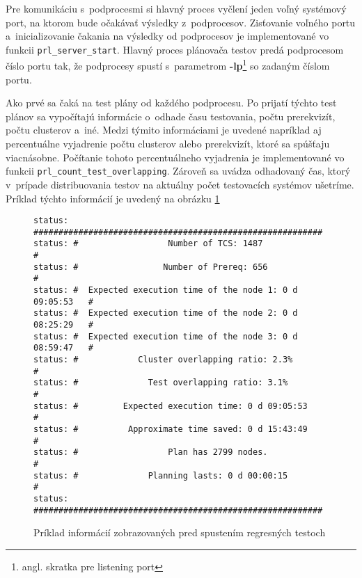 Pre komunikáciu s~podprocesmi si hlavný proces vyčlení jeden voľný systémový port,
na ktorom bude očakávať výsledky z~podprocesov. 
Zisťovanie voľného portu a~inicializovanie čakania na výsledky od podprocesov 
je implementované vo funkcii \texttt{prl\_server\_start}. 
Hlavný proces plánovača testov predá podprocesom číslo portu tak, že podprocesy
spustí s~parametrom \textbf{-lp}\footnote{angl. skratka pre listening port} so zadaným
číslom portu.

Ako prvé sa čaká na test plány od každého podprocesu. Po prijatí týchto test plánov sa vypočítajú informácie
o~odhade času testovania, počtu prerekvizít, počtu clusterov a~iné.
Medzi týmito informáciami je uvedené napríklad aj percentuálne vyjadrenie počtu clusterov alebo prerekvizít,
ktoré sa spúšťaju viacnásobne. Počítanie tohoto percentuálneho vyjadrenia 
je implementované vo funkcii \texttt{prl\_count\_test\_overlapping}.
Zároveň sa uvádza odhadovaný čas, ktorý v~prípade distribuovania testov
na aktuálny počet testovacích systémov ušetríme. Príklad týchto informácií je uvedený na obrázku \ref{obrazok:ukazka_statistiky}

\begin{figure}[h]
\begin{lstlisting}
status: ##########################################################
status: #                  Number of TCS: 1487                   #
status: #                 Number of Prereq: 656                  #
status: #  Expected execution time of the node 1: 0 d 09:05:53   #
status: #  Expected execution time of the node 2: 0 d 08:25:29   #
status: #  Expected execution time of the node 3: 0 d 08:59:47   #
status: #            Cluster overlapping ratio: 2.3%             #
status: #              Test overlapping ratio: 3.1%              #
status: #         Expected execution time: 0 d 09:05:53          #
status: #          Approximate time saved: 0 d 15:43:49          #
status: #                  Plan has 2799 nodes.                  #
status: #              Planning lasts: 0 d 00:00:15              #
status: ##########################################################
\end{lstlisting}
\caption{Príklad informácií zobrazovaných pred spustením regresných testoch}
\label{obrazok:ukazka_statistiky}
\end{figure}

